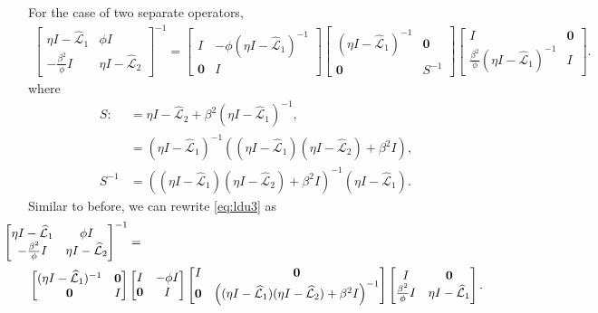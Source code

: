 \documentclass[a4paper,10pt]{article}
\begin{document}
For the case of two separate operators,
%
\begin{align}\label{eq:ldu3}
\begin{bmatrix} \eta I - \widehat{\mathcal{L}}_1 & \phi I\\
	-\frac{\beta^2}{\phi} I & \eta I - \widehat{\mathcal{L}}_2 \end{bmatrix}^{-1}
= \begin{bmatrix} I & -\phi(\eta I - \widehat{\mathcal{L}}_1)^{-1} \\ \mathbf{0} & I\end{bmatrix}
	\begin{bmatrix} (\eta I - \widehat{\mathcal{L}}_1)^{-1} & \mathbf{0} \\ \mathbf{0} & S^{-1} \end{bmatrix}
	\begin{bmatrix} I & \mathbf{0} \\ \tfrac{\beta^2}{\phi}(\eta I - \widehat{\mathcal{L}}_1)^{-1} & I
	\end{bmatrix}.
\end{align}
%
where
%
\begin{align*}
S :& = \eta I - \widehat{\mathcal{L}}_2 + \beta^2 (\eta I - \widehat{\mathcal{L}}_1)^{-1}, \\
& = (\eta I - \widehat{\mathcal{L}}_1)^{-1} \left((\eta I - \widehat{\mathcal{L}}_1)
	(\eta I - \widehat{\mathcal{L}}_2) + \beta^2 I \right), \\
S^{-1} &= \left((\eta I - \widehat{\mathcal{L}}_1)
	(\eta I - \widehat{\mathcal{L}}_2) + \beta^2 I \right)^{-1}(\eta I - \widehat{\mathcal{L}}_1).
\end{align*}
%
Similar to before, we can rewrite \eqref{eq:ldu3} as
%
\begin{align}\nonumber
&\hspace{-5ex} \begin{bmatrix} \eta I - \widehat{\mathcal{L}}_1 & \phi I\\
	-\frac{\beta^2}{\phi} I & \eta I - \widehat{\mathcal{L}}_2\end{bmatrix}^{-1}
= \\
&\begin{bmatrix} (\eta I - \widehat{\mathcal{L}}_1)^{-1} & \mathbf{0} \\ \mathbf{0} & I\end{bmatrix}
\begin{bmatrix} I & -\phi I \\ \mathbf{0} & I\end{bmatrix}
	\begin{bmatrix} I & \mathbf{0} \\ \mathbf{0} &
		\left((\eta I - \widehat{\mathcal{L}}_1)
	(\eta I - \widehat{\mathcal{L}}_2) + \beta^2 I \right)^{-1}\end{bmatrix}
	\begin{bmatrix} I & \mathbf{0} \\ \tfrac{\beta^2}{\phi} I & \eta I - \widehat{\mathcal{L}}_1
	\end{bmatrix}.\label{eq:ldu4}
\end{align}
%
\end{document}
